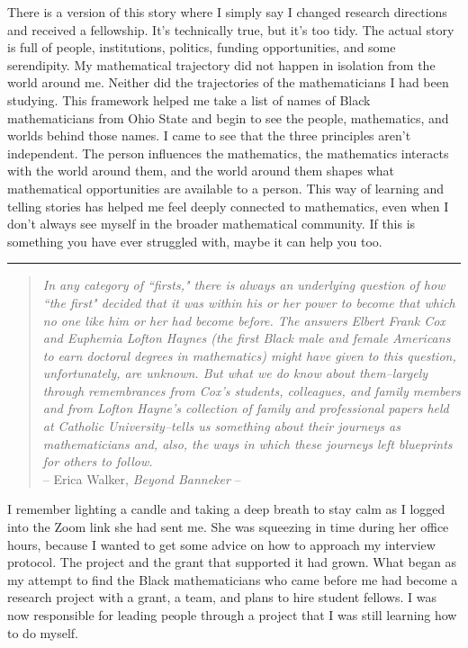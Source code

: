 \documentclass[pdflatex,sn-mathphys-num]{sn-jnl}%
\newcommand{\letterbreak}{%
    \par\bigskip
    \noindent\rule{\textwidth}{0.4pt}
    \bigskip
}
\begin{document}
There is a version of this story where I simply say I changed research directions and received a fellowship. It's technically true, but it's too tidy. The actual story is full of people, institutions, politics, funding opportunities, and some serendipity. My mathematical trajectory did not happen in isolation from the world around me. Neither did the trajectories of the mathematicians I had been studying. This framework helped me take a list of names of Black mathematicians from Ohio State and begin to see the people, mathematics, and worlds behind those names. I came to see that the three principles aren't independent. The person influences the mathematics, the mathematics interacts with the world around them, and the world around them shapes what mathematical opportunities are available to a person. This way of learning and telling stories has helped me feel deeply connected to mathematics, even when I don't always see myself in the broader mathematical community. If this is something you have ever struggled with, maybe it can help you too.\\


\letterbreak


\begin{quote}
\emph{In any category of ``firsts," there is always an underlying question of how ``the first" decided that it was within his or her power to become that which no one like him or her had become before. The answers Elbert Frank Cox and Euphemia Lofton Haynes (the first Black male and female Americans to earn doctoral degrees in mathematics) might have given to this question, unfortunately, are unknown. But what we do know about them--largely through remembrances from Cox's students, colleagues, and family members and from Lofton Hayne's collection of family and professional papers held at Catholic University--tells us something about their journeys as mathematicians and, also, the ways in which these journeys left blueprints for others to follow.}\\

\hfill -- Erica Walker, \emph{Beyond Banneker} \cite{walker2014beyond} --
\end{quote}

I remember lighting a candle and taking a deep breath to stay calm as I logged into the Zoom link she had sent me. She was squeezing in time during her office hours, because I wanted to get some advice on how to approach my interview protocol. The project and the grant that supported it had grown. What began as my attempt to find the Black mathematicians who came before me had become a research project with a grant, a team, and plans to hire student fellows. I was now responsible for leading people through a project that I was still learning how to do myself. 
\end{document}
